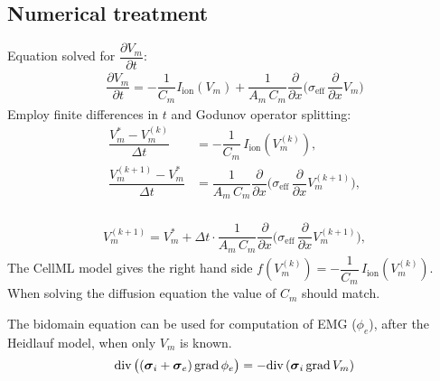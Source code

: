 \subsection{Numerical treatment}
Equation solved for $\dfrac{\partial V_m}{\partial t}$:
\begin{equation*}
  \begin{array}{lll}
  \dfrac{\partial V_m}{\partial t} = -\dfrac{1}{C_m}I_\text{ion}(V_m) + \dfrac{1}{A_m\,C_m} \dfrac{\partial}{\partial x}\Big(\sigma_\text{eff}\,\dfrac{\partial}{\partial x}V_m\Big)
  \end{array}
\end{equation*}
Employ finite differences in $t$ and Godunov operator splitting:
\begin{equation*}
  \begin{array}{lll}
  \dfrac{V_m^\ast - V_m^{(k)}}{\Delta t} &= -\dfrac{1}{C_m}\,I_\text{ion}(V_m^{(k)}),\\[4mm]
  \dfrac{V_m^{(k+1)} - V_m^{*}}{\Delta t} &= \dfrac{1}{A_m\,C_m}\dfrac{\partial}{\partial x}\Big(\sigma_\text{eff}\,\dfrac{\partial}{\partial x}V_m^{(k+1)}\Big),\\[4mm]
  \end{array}
\end{equation*}

\begin{equation*}
  \begin{array}{lll}
  V_m^{(k+1)} = V_m^{*} + \Delta t \cdot \dfrac{1}{A_m\,C_m}\dfrac{\partial}{\partial x}\Big(\sigma_\text{eff}\,\dfrac{\partial}{\partial x}V_m^{(k+1)}\Big),
  \end{array}
\end{equation*}
The CellML model gives the right hand side $f(V_m^{(k)}) = -\dfrac{1}{C_m}\,I_\text{ion}(V_m^{(k)})$. When solving the diffusion equation the value of $C_m$ should match.

    
The bidomain equation can be used for computation of EMG ($\phi_e$), after the Heidlauf model, when only $V_m$ is known.
\begin{equation*}
  \begin{array}{lll}
    \hbox{div} \,\big((\boldsymbol{\sigma}_i + \boldsymbol{\sigma}_e)\,\hbox{grad} \, \phi_e\big) = - \hbox{div} \,(\boldsymbol{\sigma}_i\,\hbox{grad} \, V_m)
  \end{array}
\end{equation*}

